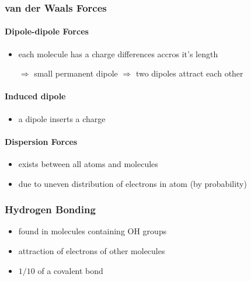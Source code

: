 \hypertarget{van-der-waals-forces}{%
\subsubsection{van der Waals Forces}\label{van-der-waals-forces}}

\hypertarget{dipole-dipole-forces}{%
\paragraph{Dipole-dipole Forces}\label{dipole-dipole-forces}}

\begin{itemize}
\item
  each molecule has a charge differences accros it's length

  \(\Rightarrow\) small permanent dipole \(\Rightarrow\) two dipoles
  attract each other
\end{itemize}

\hypertarget{induced-dipole}{%
\paragraph{Induced dipole}\label{induced-dipole}}

\begin{itemize}
\tightlist
\item
  a dipole inserts a charge
\end{itemize}

\hypertarget{dispersion-forces}{%
\paragraph{Dispersion Forces}\label{dispersion-forces}}

\begin{itemize}
\tightlist
\item
  exists between all atoms and molecules
\item
  due to uneven distribution of electrons in atom (by probability)
\end{itemize}

\hypertarget{hydrogen-bonding}{%
\subsubsection{Hydrogen Bonding}\label{hydrogen-bonding}}

\begin{itemize}
\tightlist
\item
  found in molecules containing OH groups
\item
  attraction of electrons of other molecules
\item
  \(1/10\) of a covalent bond
\end{itemize}

